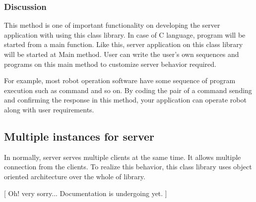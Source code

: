 \documentclass[a4paper,10pt]{jsarticle}
\begin{document}
\subsubsection*{Discussion}
This method is one of important functionality on developing the server application with using this class library.
In case of C language, program will be started from a main function. Like this, server application on this class library will be started at Main method. User can write the user's own sequences and programs on this main method to customize server behavior required.

For example, most robot operation software have some sequence of program execution such as command and so on.
By coding the pair of a command sending and confirming the response in this method, your application can operate robot along with user requirements. 


\subsection{Multiple instances for server}
In normally, server serves multiple clients at the same time. It allows multiple connection from the clients.
To realize this behavior, this class library uses object oriented architecture over the whole of library.


[ Oh! very sorry...  Documentation is undergoing yet. ]
\end{document}
